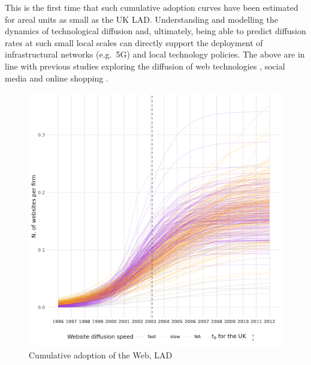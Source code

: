 \documentclass[
  authoryear,
  preprint,
  3p]{elsarticle}
\begin{document}
This is the first time that such cumulative adoption curves have been
estimated for areal units as small as the UK LAD. Understanding and
modelling the dynamics of technological diffusion and, ultimately, being
able to predict diffusion rates at such small local scales can directly
support the deployment of infrastructural networks (e.g.~5G) and local
technology policies. The above are in line with previous studies
exploring the diffusion of web technologies
\citep{PAPAGIANNIDIS2015308}, social media \citep{lengyel2020role} and
online shopping \citep{bakher2013diffusion}.

\begin{figure}[H]

{\centering \includegraphics[width=1\textwidth,height=\textheight]{../../outputs/s/lad_per_firm_all.png}

}

\caption{\label{s_lad_uk}Cumulative adoption of the Web, LAD}

\end{figure}%
\end{document}
